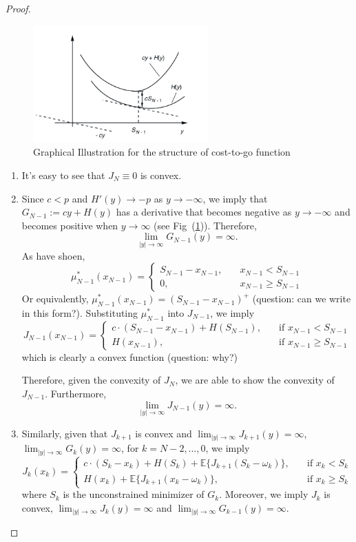 \begin{proof}
\begin{figure}
\centering
\includegraphics[width=0.6\textwidth]{Forth_lecture/p_8}
\caption{Graphical Illustration for the structure of cost-to-go function}
\label{fig:3:3}
\end{figure}
\begin{enumerate}
\item
It's easy to see that $J_N\equiv0$ is convex.
\item
Since $c<p$ and $H'(y)\to-p$ as $y\to-\infty$,
we imply that $G_{N-1}:=cy+H(y)$ has a derivative that becomes negative as $y\to-\infty$ and becomes positive when $y\to\infty$ (see Fig~(\ref{fig:3:3})). Therefore,
\[
\lim_{|y|\to\infty}G_{N-1}(y)=\infty.
\] 
As have shoen,
\[
\mu_{N-1}^*(x_{N-1})
=
\left\{
\begin{aligned}
S_{N-1} - x_{N-1},&\quad x_{N-1}<S_{N-1}\\
0,&\quad x_{N-1}\ge S_{N-1}
\end{aligned}
\right.
\]
Or equivalently, $\mu_{N-1}^*(x_{N-1})=(S_{N-1}-x_{N-1})^+$ (question: can we write in this form?). Substituting $\mu_{N-1}^*$ into $J_{N-1}$, we imply
\[
J_{N-1}(x_{N-1})=\left\{
\begin{aligned}
c\cdot(S_{N-1} - x_{N-1})+H(S_{N-1}),&\quad\text{if }x_{N-1}<S_{N-1}\\
H(x_{N-1}),&\quad\text{if }x_{N-1}\ge S_{N-1}
\end{aligned}
\right.
\]
which is clearly a convex function (question: why?)

Therefore, given the convexity of $J_N$, we are able to show the convexity of $J_{N-1}$. Furthermore,
\[
\lim_{|y|\to\infty}J_{N-1}(y)=\infty.
\]
\item
Similarly, given that $J_{k+1}$ is convex and $\lim_{|y|\to\infty}J_{k+1}(y)=\infty$, $\lim_{|y|\to\infty}G_k(y)=\infty$, for $k=N-2,\dots,0$, we imply
\[
J_k(x_k) = \left\{
\begin{aligned}
c\cdot(S_k - x_k)+H(S_k)+\mathbb{E}\{J_{k+1}(S_k - \omega_k)\},&\quad \text{if }x_k<S_k\\
H(x_k)+\mathbb{E}\{J_{k+1}(x_k-\omega_k)\},&\quad\text{if }x_k\ge S_k
\end{aligned}
\right.
\]
where $S_k$ is the unconstrained minimizer of $G_k$.
Moreover, we imply $J_k$ is convex, $\lim_{|y|\to\infty}J_k(y) = \infty$ and 
$\lim_{|y|\to\infty}G_{k-1}(y)=\infty$.
\end{enumerate}
\end{proof}

